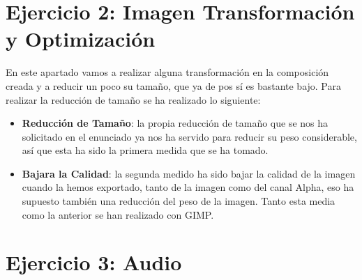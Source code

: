 \section{Ejercicio 2: Imagen Transformación y Optimización}
En este apartado vamos a realizar alguna transformación en la composición creada y a reducir un poco su tamaño, que ya de pos sí es bastante bajo. Para realizar la reducción de tamaño se ha realizado lo siguiente:

\begin{itemize}
    \item \textbf{Reducción de Tamaño}: la propia reducción de tamaño que se nos ha solicitado en el enunciado ya nos ha servido para reducir su peso considerable, así que esta ha sido la primera medida que se ha tomado.
    \item \textbf{Bajara la Calidad}: la segunda medido ha sido bajar la calidad de la imagen cuando la hemos exportado, tanto de la imagen como del canal Alpha, eso ha supuesto también una reducción del peso de la imagen. Tanto esta media como la anterior se han realizado con GIMP.
\end{itemize}

\section{Ejercicio 3: Audio}





%
%

